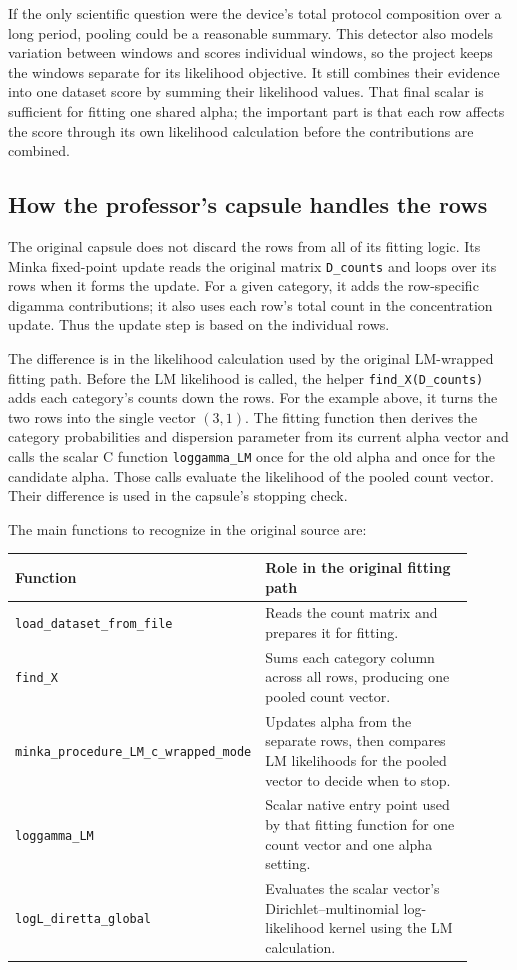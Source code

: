 \documentclass[11pt]{article}
\begin{document}
If the only scientific question were the device's total protocol composition
over a long period, pooling could be a reasonable summary. This detector also
models variation between windows and scores individual windows, so the project
keeps the windows separate for its likelihood objective. It still combines
their evidence into one dataset score by summing their likelihood values. That
final scalar is sufficient for fitting one shared alpha; the important part is
that each row affects the score through its own likelihood calculation before
the contributions are combined.

\subsection{How the professor's capsule handles the rows}

The original capsule does not discard the rows from all of its fitting logic.
Its Minka fixed-point update reads the original matrix \texttt{D\_counts} and
loops over its rows when it forms the update. For a given category, it adds the
row-specific digamma contributions; it also uses each row's total count in the
concentration update. Thus the update step is based on the individual rows.

The difference is in the likelihood calculation used by the original
LM-wrapped fitting path. Before the LM likelihood is called, the helper
\texttt{find\_X(D\_counts)} adds each category's counts down the rows. For the
example above, it turns the two rows into the single vector \((3,1)\). The
fitting function then derives the category probabilities and dispersion
parameter from its current alpha vector and calls the scalar C function
\texttt{loggamma\_LM} once for the old alpha and once for the candidate alpha.
Those calls evaluate the likelihood of the pooled count vector. Their
difference is used in the capsule's stopping check.

The main functions to recognize in the original source are:

\begin{center}
\begin{tabular}{>{\ttfamily}p{0.34\linewidth}p{0.57\linewidth}}
\toprule
Function & Role in the original fitting path \\
\midrule
\texttt{load\_dataset\_from\_file} & Reads the count matrix and prepares it for fitting. \\
\texttt{find\_X} & Sums each category column across all rows, producing one pooled count vector. \\
\texttt{minka\_procedure\_LM\_c\_wrapped\_mode} & Updates alpha from the separate rows, then compares LM likelihoods for the pooled vector to decide when to stop. \\
\texttt{loggamma\_LM} & Scalar native entry point used by that fitting function for one count vector and one alpha setting. \\
\texttt{logL\_diretta\_global} & Evaluates the scalar vector's Dirichlet--multinomial log-likelihood kernel using the LM calculation. \\
\bottomrule
\end{tabular}
\end{center}
\end{document}
